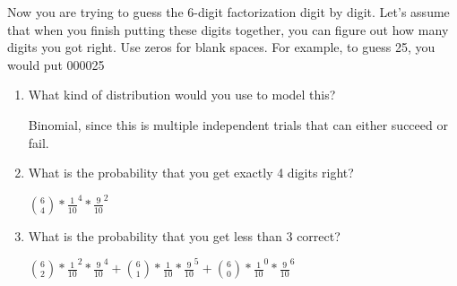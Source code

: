 \question Now you are trying to guess the 6-digit factorization digit 
by digit. Let’s assume that when you finish putting these digits together, 
you can figure out how many digits you got right. Use zeros for blank 
spaces. For example, to guess 25, you would put 000025

\begin{enumerate}[label=(\alph*)]
\item What kind of distribution would you use to model this?
\begin{solution}[1cm]
Binomial, since this is multiple independent trials that can either 
succeed or fail.
\end{solution}

\item What is the probability that you get exactly 4 digits right?
\begin{solution}[2cm]
${6 \choose 4} * \frac{1}{10}^4 * \frac{9}{10}^2$
\end{solution}		

\item What is the probability that you get less than 3 correct?
\begin{solution}[1cm]
${6 \choose 2} * \frac{1}{10}^2 * \frac{9}{10}^4 + {6 \choose 1} * 
\frac{1}{10} * \frac{9}{10}^5 + {6 \choose 0} * \frac{1}{10}^0*\frac{9}{10}^6$
		\end{solution}
\end{enumerate}